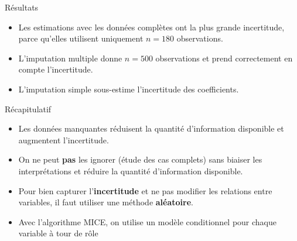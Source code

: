 \documentclass[
  ignorenonframetext,
]{beamer}
\providecommand{\tightlist}{%
  \setlength{\itemsep}{0pt}\setlength{\parskip}{0pt}}\usepackage{longtable,booktabs,array}
\begin{document}
\begin{frame}{Résultats}
\label{ruxe9sultats}
\begin{itemize}
\tightlist
\item
  Les estimations avec les données complètes ont la plus grande
  incertitude, parce qu'elles utilisent uniquement \(n=180\)
  observations.
\item
  L'imputation multiple donne \(n=500\) observations et prend
  correctement en compte l'incertitude.
\item
  L'imputation simple sous-estime l'incertitude des coefficients.
\end{itemize}

\small

\begin{table}

\caption{\label{tbl-manquantsres}Estimation des coefficients et erreurs
type pour quelques paramètres du modèle.}


\end{table}%

\normalsize
\end{frame}

\begin{frame}{Récapitulatif}
\label{ruxe9capitulatif}
\begin{itemize}
\tightlist
\item
  Les données manquantes réduisent la quantité d'information disponible
  et augmentent l'incertitude.
\item
  On ne peut \textbf{pas} les ignorer (étude des cas complets) sans
  biaiser les interprétations et réduire la quantité d'information
  disponible.
\item
  Pour bien capturer l'\textbf{incertitude} et ne pas modifier les
  relations entre variables, il faut utiliser une méthode
  \textbf{aléatoire}.
\item
  Avec l'algorithme MICE, on utilise un modèle conditionnel pour chaque
  variable à tour de rôle
\end{itemize}
\end{frame}
\end{document}
